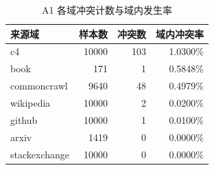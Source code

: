 \begin{table}[!htbp]
\centering
\songti{}
\setlength{\tabcolsep}{4pt}
\caption{A1 各域冲突计数与域内发生率}
\label{tab:q1-conflict-domains}
\begin{tabular}{lrrr}
\toprule
来源域 & 样本数 & 冲突数 & 域内冲突率 \\
\midrule
c4 & 10000 & 103 & 1.0300\% \\
book & 171 & 1 & 0.5848\% \\
commoncrawl & 9640 & 48 & 0.4979\% \\
wikipedia & 10000 & 2 & 0.0200\% \\
github & 10000 & 1 & 0.0100\% \\
arxiv & 1419 & 0 & 0.0000\% \\
stackexchange & 10000 & 0 & 0.0000\% \\
\bottomrule
\end{tabular}
\end{table}
